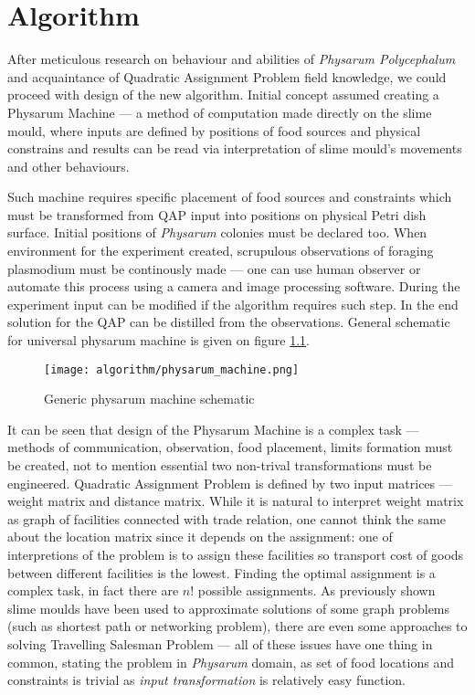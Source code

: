 \chapter{Algorithm}
\label{chapter:algorithm}

After meticulous research on behaviour and abilities of \textit{Physarum Polycephalum} and acquaintance of Quadratic Assignment Problem field knowledge, we could proceed with design of the new algorithm. Initial concept assumed creating a Physarum Machine --- a method of computation made directly on the slime mould, where inputs are defined by positions of food sources and physical constrains and results can be read via interpretation of slime mould's movements and other behaviours.

Such machine requires specific placement of food sources and constraints which must be transformed from QAP input into positions on physical Petri dish surface. Initial positions of \textit{Physarum} colonies must be declared too. When environment for the experiment created, scrupulous observations of foraging plasmodium must be continously made --- one can use human observer or automate this process using a camera and image processing software. During the experiment input can be modified if the algorithm requires such step. In the end solution for the QAP can be distilled from the observations. General schematic for universal physarum machine is given on figure \ref{figure:a_machine}.

\begin{figure}
  \centering
  \texttt{[image: algorithm/physarum\_machine.png]}
  \caption{Generic physarum machine schematic}
  \label{figure:a_machine}
\end{figure}

It can be seen that design of the Physarum Machine is a complex task --- methods of communication, observation, food placement, limits formation must be created, not to mention essential two non-trival transformations must be engineered. Quadratic Assignment Problem is defined by two input matrices --- weight matrix and distance matrix. While it is natural to interpret weight matrix as graph of facilities connected with trade relation, one cannot think the same about the location matrix since it depends on the assignment: one of interpretions of the problem is to assign these facilities so transport cost of goods between different facilities is the lowest. Finding the optimal assignment is a complex task, in fact there are $n!$ possible assignments. As previously shown slime moulds have been used to approximate solutions of some graph problems (such as shortest path or networking problem), there are even some approaches to solving Travelling Salesman Problem --- all of these issues have one thing in common, stating the problem in \textit{Physarum} domain, as set of food locations and constraints is trivial as \textit{input transformation} is relatively easy function. 

